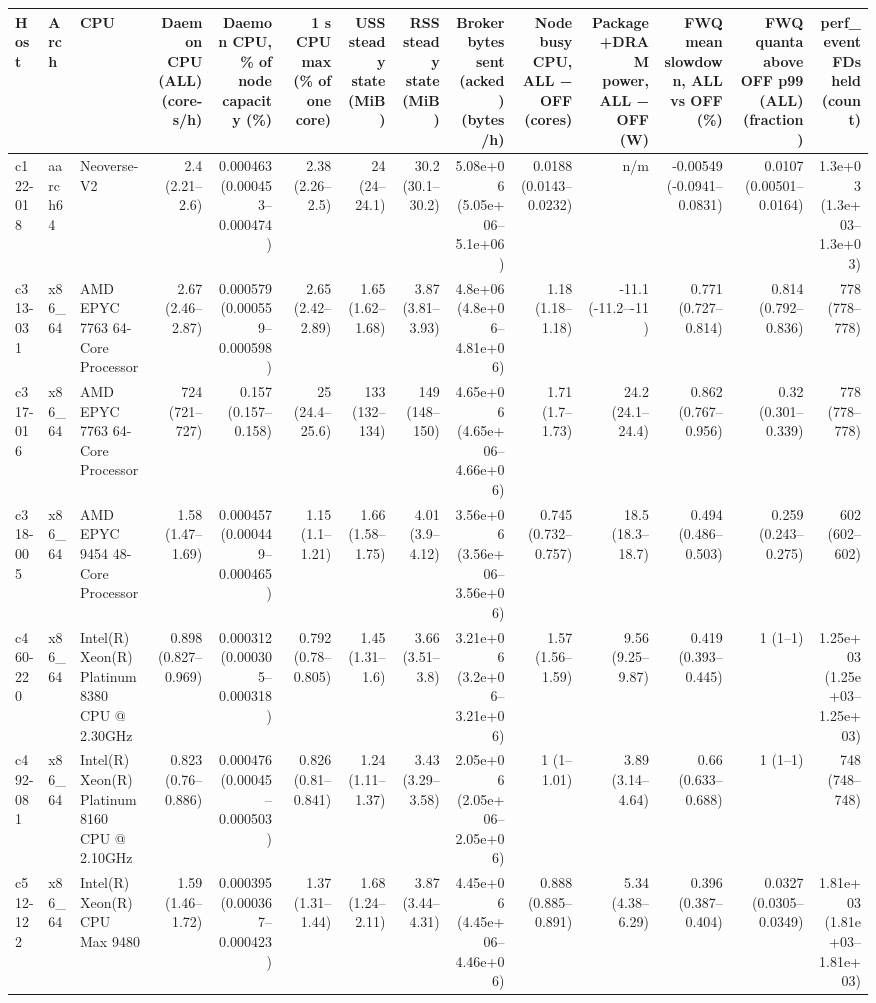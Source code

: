 \begin{tabular}{lllrrrrrrrrrrr}
\toprule
Host & Arch & CPU & Daemon CPU (ALL) (core-s/h) & Daemon CPU, \% of node capacity (\%) & 1 s CPU max (\% of one core) & USS steady state (MiB) & RSS steady state (MiB) & Broker bytes sent (acked) (bytes/h) & Node busy CPU, ALL − OFF (cores) & Package+DRAM power, ALL − OFF (W) & FWQ mean slowdown, ALL vs OFF (\%) & FWQ quanta above OFF p99 (ALL) (fraction) & perf\_event FDs held (count) \\
\midrule
c122-018 & aarch64 & Neoverse-V2 & 2.4 (2.21–2.6) & 0.000463 (0.000453–0.000474) & 2.38 (2.26–2.5) & 24 (24–24.1) & 30.2 (30.1–30.2) & 5.08e+06 (5.05e+06–5.1e+06) & 0.0188 (0.0143–0.0232) & n/m & -0.00549 (-0.0941–0.0831) & 0.0107 (0.00501–0.0164) & 1.3e+03 (1.3e+03–1.3e+03) \\
c313-031 & x86\_64 & AMD EPYC 7763 64-Core Processor & 2.67 (2.46–2.87) & 0.000579 (0.000559–0.000598) & 2.65 (2.42–2.89) & 1.65 (1.62–1.68) & 3.87 (3.81–3.93) & 4.8e+06 (4.8e+06–4.81e+06) & 1.18 (1.18–1.18) & -11.1 (-11.2–-11) & 0.771 (0.727–0.814) & 0.814 (0.792–0.836) & 778 (778–778) \\
c317-016 & x86\_64 & AMD EPYC 7763 64-Core Processor & 724 (721–727) & 0.157 (0.157–0.158) & 25 (24.4–25.6) & 133 (132–134) & 149 (148–150) & 4.65e+06 (4.65e+06–4.66e+06) & 1.71 (1.7–1.73) & 24.2 (24.1–24.4) & 0.862 (0.767–0.956) & 0.32 (0.301–0.339) & 778 (778–778) \\
c318-005 & x86\_64 & AMD EPYC 9454 48-Core Processor & 1.58 (1.47–1.69) & 0.000457 (0.000449–0.000465) & 1.15 (1.1–1.21) & 1.66 (1.58–1.75) & 4.01 (3.9–4.12) & 3.56e+06 (3.56e+06–3.56e+06) & 0.745 (0.732–0.757) & 18.5 (18.3–18.7) & 0.494 (0.486–0.503) & 0.259 (0.243–0.275) & 602 (602–602) \\
c460-220 & x86\_64 & Intel(R) Xeon(R) Platinum 8380 CPU @ 2.30GHz & 0.898 (0.827–0.969) & 0.000312 (0.000305–0.000318) & 0.792 (0.78–0.805) & 1.45 (1.31–1.6) & 3.66 (3.51–3.8) & 3.21e+06 (3.2e+06–3.21e+06) & 1.57 (1.56–1.59) & 9.56 (9.25–9.87) & 0.419 (0.393–0.445) & 1 (1–1) & 1.25e+03 (1.25e+03–1.25e+03) \\
c492-081 & x86\_64 & Intel(R) Xeon(R) Platinum 8160 CPU @ 2.10GHz & 0.823 (0.76–0.886) & 0.000476 (0.00045–0.000503) & 0.826 (0.81–0.841) & 1.24 (1.11–1.37) & 3.43 (3.29–3.58) & 2.05e+06 (2.05e+06–2.05e+06) & 1 (1–1.01) & 3.89 (3.14–4.64) & 0.66 (0.633–0.688) & 1 (1–1) & 748 (748–748) \\
c512-122 & x86\_64 & Intel(R) Xeon(R) CPU Max 9480 & 1.59 (1.46–1.72) & 0.000395 (0.000367–0.000423) & 1.37 (1.31–1.44) & 1.68 (1.24–2.11) & 3.87 (3.44–4.31) & 4.45e+06 (4.45e+06–4.46e+06) & 0.888 (0.885–0.891) & 5.34 (4.38–6.29) & 0.396 (0.387–0.404) & 0.0327 (0.0305–0.0349) & 1.81e+03 (1.81e+03–1.81e+03) \\

\end{tabular}
